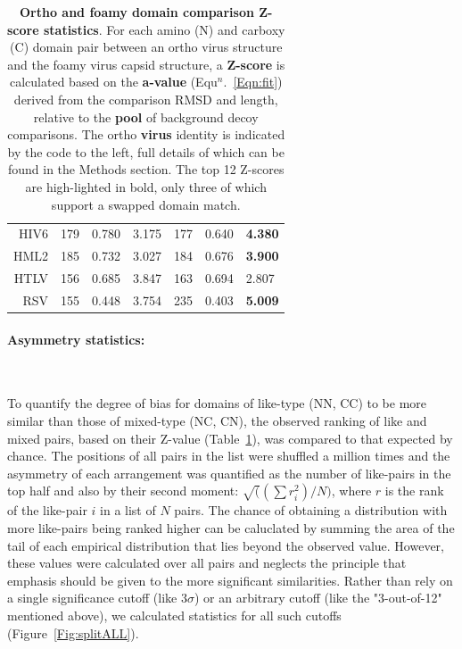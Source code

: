 \documentclass[preprint,12pt]{elsarticle}
\newcommand{\Tab}[1]{Table~\ref{Tab:#1}}
\newcommand{\Fig}[1]{Figure~\ref{Fig:#1}}
\newcommand{\Eqn}[1]{Equ$^n$.~\ref{Eqn:#1}}
\begin{document}
\begin{table}
\begin{tabular}{r|lll|lll|}
HIV6   &  179  & 0.780 &      3.175  &  177  & 0.640 & {\bf 4.380} \\
HML2   &  185  & 0.732 &      3.027  &  184  & 0.676 & {\bf 3.900} \\
HTLV   &  156  & 0.685 &      3.847  &  163  & 0.694 &      2.807  \\
RSV    &  155  & 0.448 &      3.754  &  235  & 0.403 & {\bf 5.009} \\
\hline \hline
\end{tabular}
\begin{footnotesize}
\caption{
\label{Tab:Zscores}
{\bf Ortho and foamy domain comparison Z-score statistics}.
For each amino (N) and carboxy (C) domain pair between an ortho virus structure and the foamy virus capsid structure,
a {\bf Z-score} is calculated based on the {\bf a-value} (\Eqn{fit}) derived from the comparison RMSD and length,
relative to the {\bf pool} of background decoy comparisons.   The ortho {\bf virus} identity is indicated by the
code to the left, full details of which can be found in the Methods section.
The top 12 Z-scores are high-lighted in bold, only three of which support a swapped domain match.
}
\end{footnotesize}
\end{table}

\paragraph{Asymmetry statistics:}\

To quantify the degree of bias for domains of like-type (NN, CC) to be more similar than those of mixed-type (NC, CN),
the observed ranking of like and mixed pairs, based on their Z-value (\Tab{Zscores}), was compared to that expected by
chance.  The positions of all pairs in the list were shuffled a million times and the asymmetry of each arrangement was
quantified as the number of like-pairs in the top half and also by their second moment: $\surd((\sum r^2_i)/N)$, where $r$
is the rank of the like-pair $i$ in a list of $N$ pairs.  The chance of obtaining a distribution with more like-pairs
being ranked higher can be caluclated by summing the area of the tail of each empirical distribution that lies beyond the
observed value.   However, these values were calculated over all pairs and neglects the principle that emphasis should
be given to the more significant similarities.  Rather than rely on a single significance cutoff (like 3$\sigma$) or an
arbitrary cutoff (like the "3-out-of-12" mentioned above), we calculated statistics for all such cutoffs (\Fig{splitALL}).
\end{document}
